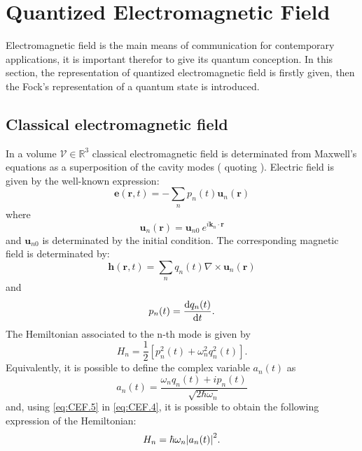 \section{Quantized Electromagnetic Field}
    Electromagnetic field is the main means of communication for contemporary
    applications, it is important therefor to give its quantum conception.
    In this section, the representation of quantized electromagnetic field is 
    firstly given, then the Fock's representation of a quantum state is introduced.
            
    \subsection{Classical electromagnetic field}
        In a volume $\mathcal{V}\in\mathbb{R}^3$ classical electromagnetic field is 
        determinated from Maxwell's equations as a superposition of the cavity modes
        (\cite{tesiGuerrini} quoting \cite{quantumRad_Louissel,quantumOptic_Mandel}).
        Electric field is given by the well-known expression:
        \begin{equation}
            \pmb{e}(\pmb{r},t)=-\sum_n p_n (t)\pmb{u}_n (\pmb{r})
            \label{eq:CEF.1}
        \end{equation}
        where
        \begin{equation*}
            \pmb{u}_n (\pmb{r})=\pmb{u}_{n0}\ e^{i\pmb{k}_n \cdot \pmb{r}}
        \end{equation*}
        and $\pmb{u}_{n0}$ is determinated by the initial condition.
        The corresponding magnetic field is determinated by:
        \begin{equation}
            \pmb{h}(\pmb{r},t)=\sum_n q_n (t)\nabla\times\pmb{u}_n (\pmb{r})
            \label{eq:CEF.2}
        \end{equation}
        and
        \begin{equation}
            p_n (t)=\derivative{q_n (t)}{t} .
            \label{eq:CEF.3}
        \end{equation}
        The Hemiltonian associated to the n-th mode is given by
        \begin{equation}
            H_n=\frac{1}{2}[p_n^2(t)+\omega_n^2q_n^2(t)].
            \label{eq:CEF.4}
        \end{equation}
        Equivalently, it is possible to define the complex variable $a_n(t)$ as
        \begin{equation}
            a_n(t)=\frac{\omega_nq_n(t)+ip_n(t)}{\sqrt{2\hbar\omega_n}}
            \label{eq:CEF.5}
        \end{equation}
        and, using \ref{eq:CEF.5} in \ref{eq:CEF.4}, it is possible to obtain the following
        expression of the Hemiltonian:
        \begin{equation}
            H_n=\hbar\omega_n\absolutevalue{a_n(t)}^2.
            \label{eq_CEF.6}
        \end{equation}

